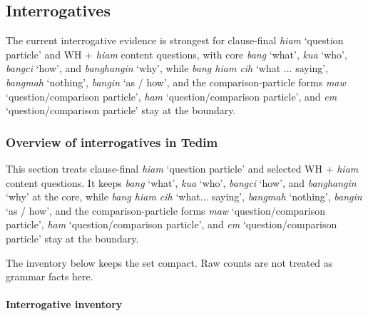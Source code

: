\documentclass[
  11pt,
  a4paper,
]{article}
\newcommand{\tdim}[1]{\textit{#1}}
\newcommand{\glossquote}[1]{`#1'}
\begin{document}
\subsection{Interrogatives}\label{interrogatives}

The current interrogative evidence is strongest for clause-final
\tdim{hiam} \glossquote{question particle} and WH + \tdim{hiam} content
questions, with core \tdim{bang} \glossquote{what}, \tdim{kua}
\glossquote{who}, \tdim{bangci} \glossquote{how}, and \tdim{banghangin}
\glossquote{why}, while \tdim{bang hiam cih}
\glossquote{what ... saying}, \tdim{bangmah} \glossquote{nothing},
\tdim{bangin} \glossquote{as / how}, and the comparison-particle forms
\tdim{maw} \glossquote{question/comparison particle}, \tdim{ham}
\glossquote{question/comparison particle}, and \tdim{em}
\glossquote{question/comparison particle} stay at the boundary.

\subsubsection{Overview of interrogatives in
Tedim}\label{overview-of-interrogatives-in-tedim}

This section treats clause-final \tdim{hiam}
\glossquote{question particle} and selected WH + \tdim{hiam} content
questions. It keeps \tdim{bang} \glossquote{what}, \tdim{kua}
\glossquote{who}, \tdim{bangci} \glossquote{how}, and \tdim{banghangin}
\glossquote{why} at the core, while \tdim{bang hiam cih}
\glossquote{what... saying}, \tdim{bangmah} \glossquote{nothing},
\tdim{bangin} \glossquote{as / how}, and the comparison-particle forms
\tdim{maw} \glossquote{question/comparison particle}, \tdim{ham}
\glossquote{question/comparison particle}, and \tdim{em}
\glossquote{question/comparison particle} stay at the boundary.

The inventory below keeps the set compact. Raw counts are not treated as
grammar facts here.

\paragraph{Interrogative inventory}\label{interrogative-inventory}
\end{document}

